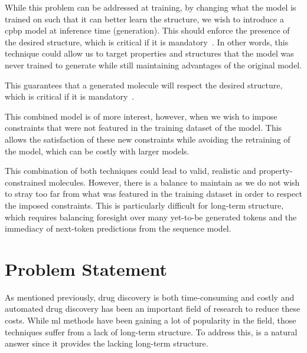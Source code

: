 \documentclass[../Document.tex]{subfiles}
\begin{document}
While this problem can be addressed at training, by changing what the model is trained on such that it can better learn the structure, we wish to introduce a \gls{cpbp} model at inference time (generation). This should enforce the presence of the desired structure, which is critical if it is mandatory~\cite{deutsch2019general,lee2019gradient}.
In other words, this technique could allow us to target properties and structures that the model was never trained to generate while still maintaining advantages of the original model.

This guarantees that a generated molecule will respect the desired structure, which is critical if it is mandatory~\cite{deutsch2019general,lee2019gradient}.

This combined model is of more interest, however, when we wish to impose constraints that were not featured in the training dataset of the model. This allows the satisfaction of these new constraints while avoiding the retraining of the model, which can be costly with larger models.

This combination of both techniques could lead to valid, realistic and property-constrained molecules. However, there is a balance to maintain as we do not wish to stray too far from what was featured in the training dataset in order to respect the imposed constraints. This is particularly difficult for long-term structure, which requires balancing foresight over many yet-to-be generated tokens and the immediacy of next-token predictions from the sequence model.















\section{Problem Statement}
\label{sec:intro/problem}

As mentioned previously, drug discovery is both time-consuming and costly and automated drug discovery has been an important field of research to reduce these costs.
While \gls{ml} methods have been gaining a lot of popularity in the field, those techniques suffer from a lack of long-term structure.
To address this, \cp is a natural answer since it provides the lacking long-term structure.
\end{document}
